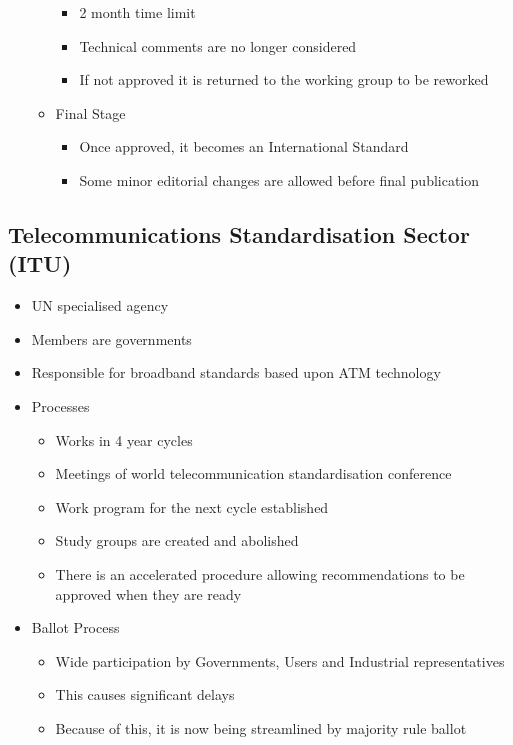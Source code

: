 \begin{itemize}
\begin{itemize}
\begin{itemize}
      \item 2 month time limit
      \item Technical comments are no longer considered
      \item If not approved it is returned to the working group to be reworked
    \end{itemize}
    \item Final Stage
    \begin{itemize}
      \item Once approved, it becomes an International Standard
      \item Some minor editorial changes are allowed before final publication
    \end{itemize}
  \end{itemize}
\end{itemize}

\subsection*{Telecommunications Standardisation Sector (ITU)}

\begin{itemize}
  \item UN specialised agency
  \item Members are governments
  \item Responsible for broadband standards based upon ATM technology
  \item Processes
  \begin{itemize}
    \item Works in 4 year cycles
    \item Meetings of world telecommunication standardisation conference
    \item Work program for the next cycle established
    \item Study groups are created and abolished
    \item There is an accelerated procedure allowing recommendations to be approved when they are ready
  \end{itemize}
  \item Ballot Process
  \begin{itemize}
    \item Wide participation by Governments, Users and Industrial representatives
    \item This causes significant delays
    \item Because of this, it is now being streamlined by majority rule ballot
  \end{itemize}
\end{itemize}


